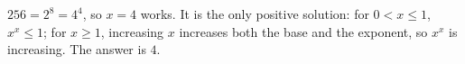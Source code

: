 $256=2^8=4^4$, so $x=4$ works. It is the only positive solution: for $0<x\le1$, $x^x\le1$; for $x\ge1$, increasing $x$ increases both the base and the exponent, so $x^x$ is increasing. The answer is $\boxed{4}$.

